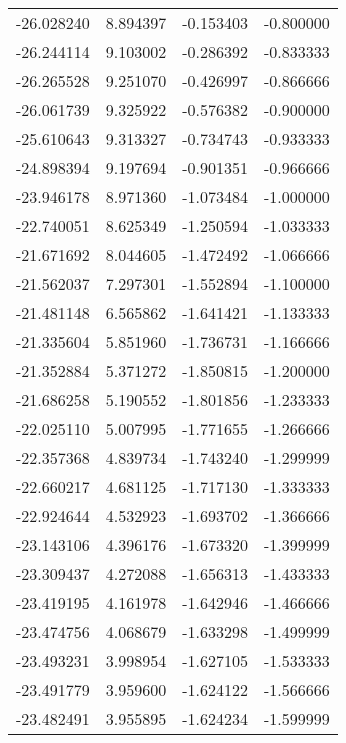 \begin{tabular}{rrrr}
      -26.028240 &         8.894397 &   -0.153403 &  -0.800000 \\
      -26.244114 &         9.103002 &   -0.286392 &  -0.833333 \\
      -26.265528 &         9.251070 &   -0.426997 &  -0.866666 \\
      -26.061739 &         9.325922 &   -0.576382 &  -0.900000 \\
      -25.610643 &         9.313327 &   -0.734743 &  -0.933333 \\
      -24.898394 &         9.197694 &   -0.901351 &  -0.966666 \\
      -23.946178 &         8.971360 &   -1.073484 &  -1.000000 \\
      -22.740051 &         8.625349 &   -1.250594 &  -1.033333 \\
      -21.671692 &         8.044605 &   -1.472492 &  -1.066666 \\
      -21.562037 &         7.297301 &   -1.552894 &  -1.100000 \\
      -21.481148 &         6.565862 &   -1.641421 &  -1.133333 \\
      -21.335604 &         5.851960 &   -1.736731 &  -1.166666 \\
      -21.352884 &         5.371272 &   -1.850815 &  -1.200000 \\
      -21.686258 &         5.190552 &   -1.801856 &  -1.233333 \\
      -22.025110 &         5.007995 &   -1.771655 &  -1.266666 \\
      -22.357368 &         4.839734 &   -1.743240 &  -1.299999 \\
      -22.660217 &         4.681125 &   -1.717130 &  -1.333333 \\
      -22.924644 &         4.532923 &   -1.693702 &  -1.366666 \\
      -23.143106 &         4.396176 &   -1.673320 &  -1.399999 \\
      -23.309437 &         4.272088 &   -1.656313 &  -1.433333 \\
      -23.419195 &         4.161978 &   -1.642946 &  -1.466666 \\
      -23.474756 &         4.068679 &   -1.633298 &  -1.499999 \\
      -23.493231 &         3.998954 &   -1.627105 &  -1.533333 \\
      -23.491779 &         3.959600 &   -1.624122 &  -1.566666 \\
      -23.482491 &         3.955895 &   -1.624234 &  -1.599999 \\

\end{tabular}
